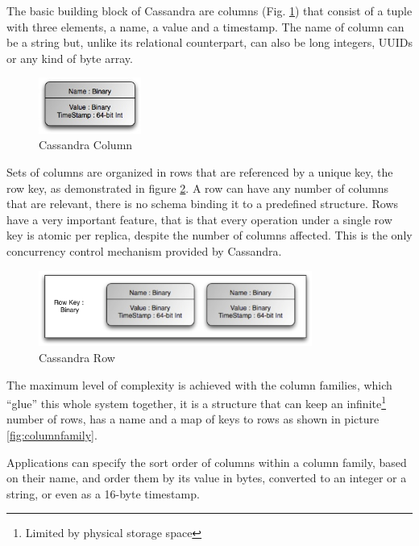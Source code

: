 The basic building block of Cassandra are columns (Fig. \ref{fig:column}) that consist of a tuple with three elements, a name, a value and a timestamp. The name of column can be a string but, unlike its relational counterpart, can also be long integers, UUIDs or any kind of byte array.

\begin{figure}[htb]
  \begin{center}
    \leavevmode
    \includegraphics[width=0.3\textwidth]{images/column.jpg}
  \end{center}
  \caption{Cassandra Column}
  \label{fig:column}
\end{figure}

Sets of columns are organized in rows that are referenced by a unique key, the row key, as demonstrated in figure \ref{fig:row}. A row can have any number of columns that are relevant, there is no schema binding it to a predefined structure. Rows have a very important feature, that is that every operation under a single row key is atomic per replica, despite the number of columns affected. This is the only concurrency control mechanism provided by Cassandra.

\begin{figure}[!htb]
  \begin{center}
    \leavevmode
    \includegraphics[width=0.8\textwidth]{images/row}
  \end{center}
  \caption{Cassandra Row}
  \label{fig:row}
\end{figure}

The maximum level of complexity is achieved with the column families, which ``glue'' this whole system together, it is a structure that can keep an infinite\footnote{Limited by physical storage space} number of rows, has a name and a map of keys to rows as shown in picture \ref{fig:columnfamily}. 

Applications can specify the sort order of columns within a column family, based on their name, and order them by its value in bytes, converted to an integer or a string, or even as a 16-byte timestamp.

